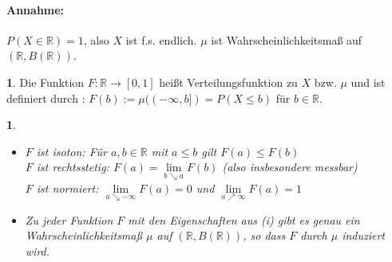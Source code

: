 \documentclass[10pt,a4paper]{report}
\newcommand{\R}{\mathbb{R}}
\numberwithin{equation}{section}
\numberwithin{figure}{section}
\theoremstyle{plain}
\theoremstyle{definition}
\newtheorem{defn}[thm]{\protect\definitionname}
\theoremstyle{remark}
\theoremstyle{plain}
\newtheorem{prop}[thm]{\protect\propositionname}
\providecommand{\definitionname}{Definition}
\providecommand{\propositionname}{Satz}
\newcommand{\1}{ \mathbb{1} } %
\begin{document}
\paragraph{Annahme:} $P(X\in \R)=1$, also $X$ ist f.s. endlich. $\mu$ ist Wahrscheinlichkeitsmaß auf $(\R,B(\R))$.
\begin{defn}
  Die Funktion $F:\R \to [0,1]$ heißt Verteilungsfunktion zu $X$ bzw. $\mu$ und ist definiert durch : $F(b):=\mu((-\infty,b])=P(X\leq b)$ für $b \in \R$.
\end{defn}
\begin{prop} \    
  \begin{itemize}
  \item[(i)] $F$ ist isoton: Für $a,b \in \R$ mit $a \leq b$ gilt $F(a)\leq F(b)$\\
    $F$ ist rechtsstetig: $F(a)=\lim\limits_{b\searrow a}F(b)$ (also insbesondere messbar)\\
    $F$ ist normiert: $\lim\limits_{a\searrow -\infty}F(a)=0$ und
    $\lim\limits_{a\nearrow \infty}F(a)=1$
  \item[(ii)] Zu jeder Funktion $F$ mit den Eigenschaften aus (i) gibt
    es genau ein Wahrscheinlichkeitsmaß $\mu$ auf $(\R,B(\R))$, so dass $F$ durch $\mu$
    induziert wird.
  \end{itemize}
\end{prop}
\end{document}
